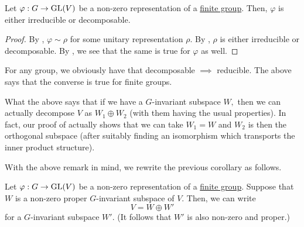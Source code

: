 \begin{cor} \label{cor:fingroupirrordec}
	Let $\varphi:G\to \operatorname{GL}(V)$ be a non-zero representation of a \underline{finite group}. Then, $\varphi$ is either irreducible or decomposable.
\end{cor}
\begin{proof} 
	By , $\varphi \sim \rho$ for some unitary representation $\rho.$ By , $\rho$ is either irreducible or decomposable. By , we see that the same is true for $\varphi$ as well.
\end{proof}
\begin{rem}
	For any group, we obviously have that decomposable $\implies$ reducible. The above says that the converse is true for finite groups.

	What the above says that if we have a $G$-invariant subspace $W,$ then we can actually decompose $V$ as $W_1 \oplus W_2$ (with them having the usual properties). In fact, our proof of  actually shows that we can take $W_1 = W$ and $W_2$ is then the orthogonal subspace (after suitably finding an isomorphism which transports the inner product structure).
\end{rem}

With the above remark in mind, we rewrite the previous corollary as follows.

\begin{cor} \label{cor:existenceofcomplimentaryGinvarsubs}
	Let $\varphi:G\to \operatorname{GL}(V)$ be a non-zero representation of a \underline{finite group}. Suppose that $W$ is a non-zero proper $G$-invariant subspace of $V.$ Then, we can write
	\begin{equation*} 
		V = W \oplus W'
	\end{equation*}
	for a $G$-invariant subspace $W'.$ (It follows that $W'$ is also non-zero and proper.)
\end{cor}


